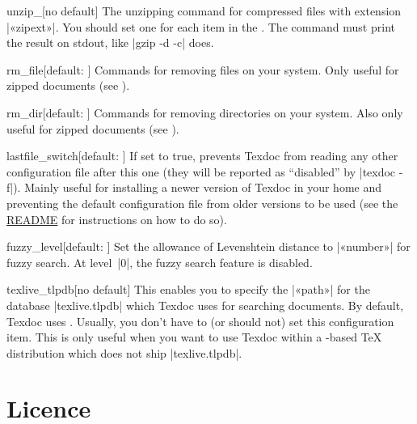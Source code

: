 \documentclass{texdoc-doc}
\begin{document}
\begin{confitem}{unzip\_}{}[no default]
The unzipping command for compressed files with extension |«zipext»|. You
should set one for each item in the . The command must print
the result on stdout, like |gzip -d -c| does.
\end{confitem}

\begin{confitem}{rm\_file}{}[default: ]
Commands for removing files on your system. Only useful for zipped documents
(see ).
\end{confitem}

\begin{confitem}{rm\_dir}{}[default: ]
Commands for removing directories on your system. Also only useful for zipped
documents (see ).
\end{confitem}

\begin{confitem}{lastfile\_switch}{}[default: ]
If set to true, prevents Texdoc from reading any other configuration file after
this one (they will be reported as ``disabled'' by |texdoc -f|). Mainly useful
for installing a newer version of Texdoc in your home and preventing the
default configuration file from older versions to be used (see the
\href{https://github.com/TeX-Live/texdoc}{README} for instructions on how to do
so).
\end{confitem}

\begin{confitem}{fuzzy\_level}{}[default: ]
Set the allowance of Levenshtein distance to |«number»| for fuzzy search. At
level~|0|, the fuzzy search feature is disabled.
\end{confitem}

\begin{confitem}{texlive\_tlpdb}{}[no default]
This enables you to specify the |«path»| for the database |texlive.tlpdb| which
Texdoc uses for searching documents. By default, Texdoc uses
. Usually, you don't have to (or should
not) set this configuration item. This is only useful when you want to use
Texdoc within a {\TL}-based {\TeX} distribution which does not ship
|texlive.tlpdb|.
\end{confitem}

\section{Licence}
\label{sec:licence}
\end{document}

